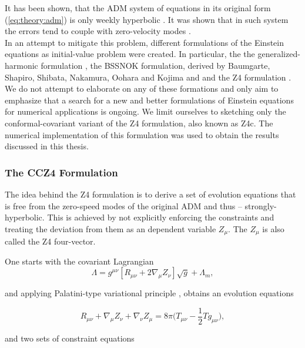 \documentclass[11pt,a4paper,headinclude=true,DIV=14,BCOR=8mm,chapterprefix,listof=totoc,twoside,openright,abstracton]{scrbook}
\begin{document}
It has been shown, that the ADM system of equations in its original form (\ref{eq:theory:adm}) is only weekly hyperbolic \cite{Baumgarte:2002jm}. It was shown that in such system the errors tend to couple with zero-velocity modes \cite{Alcubierre:1999rt}.  \\
In an attempt to mitigate this problem, different formulations of the Einstein equations as initial-value problem were created. In particular, the the generalized-harmonic formulation \cite{Friedrich:1985,Lindblom:2005qh,Lindblom:2009}, the BSSNOK formulation, derived by Baumgarte, Shapiro, Shibata, Nakamura, Oohara and Kojima \cite{Nakamura1987,Shibata:1995we,Baumgarte:1998te} and and the Z4 formulation \cite{Bona:2003fj,Bernuzzi:2009ex,Ruiz:2010qj,Weyhausen:2011cg,Alic:2011gg}. We do not attempt to elaborate on any of these formations and only aim to emphasize that a search for a new and better formulations of Einstein equations for numerical applications is ongoing. We limit ourselves to sketching only the conformal-covariant variant of the Z4 formulation, also known as Z4c. The numerical implementation of this formulation was used to obtain the results discussed in this thesis. 


\subsubsection*{The CCZ4 Formulation}

The idea behind the Z4 formulation is to derive a set of evolution equations that is free from the zero-speed modes of the original ADM and thus -- strongly-hyperbolic. This is achieved by not explicitly enforcing the constraints and treating the deviation from them as an dependent variable $Z_{\mu}$. The $Z_{\mu}$ is also called the Z4 four-vector.

One starts with the covariant Lagrangian
\begin{equation}
    \Lambda = g^{\mu\nu}[R_{\mu\nu} + 2\nabla_{\mu}Z_{\nu}]\sqrt{g} + \Lambda_m,
\end{equation}

and applying Palatini-type variational principle \cite{Bona:2010is}, obtains an evolution equations

\begin{equation}
    R_{\mu\nu} + \nabla_{\mu}Z_{\nu} + \nabla_{\nu}Z_{\mu}=8\pi\Big(T_{\mu\nu} - \frac{1}{2}Tg_{\mu\nu}\Big),
    \label{eq:theory:z4fieldeq}
\end{equation}

and two sets of constraint equations
\end{document}
